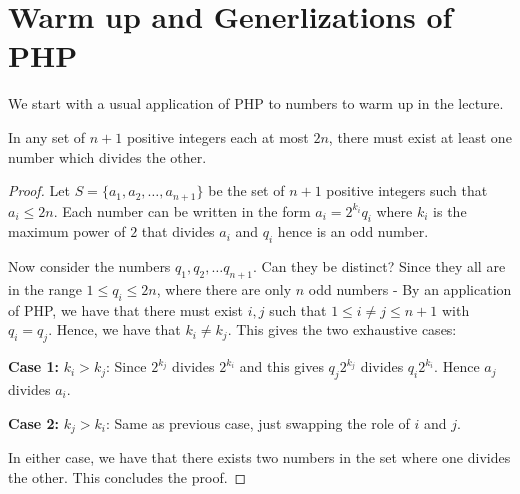 %



\section{Warm up and  Generlizations of PHP}

We start with a usual application of PHP to numbers to warm up in the lecture.
\begin{theorem}
In any set of $n+1$ positive integers each at most $2n$, there must exist at least one number which divides the other. 
\end{theorem}
\begin{proof}
Let $S = \{a_1, a_2, \ldots , a_{n+1}\}$ be the set of $n+1$ positive integers such that $a_i \le 2n$. Each number can be written in the form $a_i = 2^{k_i}q_i$ where $k_i$ is the maximum power of $2$ that divides $a_i$ and $q_i$ hence is an odd number.

Now consider the numbers $q_1, q_2, \ldots q_{n+1}$. Can they be distinct? Since they all are in the range $1 \le q_i \le 2n$, where there are only $n$ odd numbers - By an application of PHP, we have that there must exist $i, j$ such that $1 \le i \ne j \le n+1$ with $q_i = q_j$.  Hence, we have that $k_i \ne k_j$. This gives the two exhaustive cases:

\begin{description}
\item{{\bf Case 1:} $k_i > k_j$:} Since $2^{k_j}$ divides $2^{k_i}$ and this gives $q_j2^{k_j}$ divides $q_i2^{k_i}$. Hence $a_j$ divides $a_i$.
\item{{\bf Case 2:} $k_j > k_i$:} Same as previous case, just swapping the role of $i$ and $j$.
\end{description}
In either case, we have that there exists two numbers in the set where one divides the other. This concludes the proof.
\end{proof}

